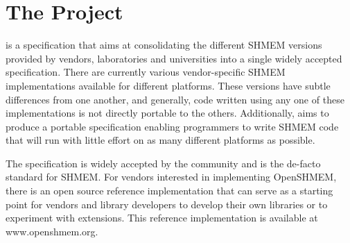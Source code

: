 
\section{The \openshmem{} Project}

\openshmem{} is a specification that aims at consolidating the different
SHMEM versions provided by vendors, laboratories and universities 
into a single widely accepted specification. There are currently various vendor-specific SHMEM implementations available for
different platforms. These versions have subtle differences from one
another, and generally, code written using any one of these
implementations is not directly portable to the others. Additionally, \openshmem{} aims
to produce a portable specification enabling programmers to write
SHMEM code that will run with little effort on as many different platforms
as possible.

The \openshmem{} specification is widely accepted by the community and is the de-facto
standard for SHMEM.  For vendors interested in implementing OpenSHMEM, there is an open source reference implementation
that can serve as a starting point for vendors and library developers to develop their own libraries or to experiment with extensions. 
This reference implementation is available at www.openshmem.org.
